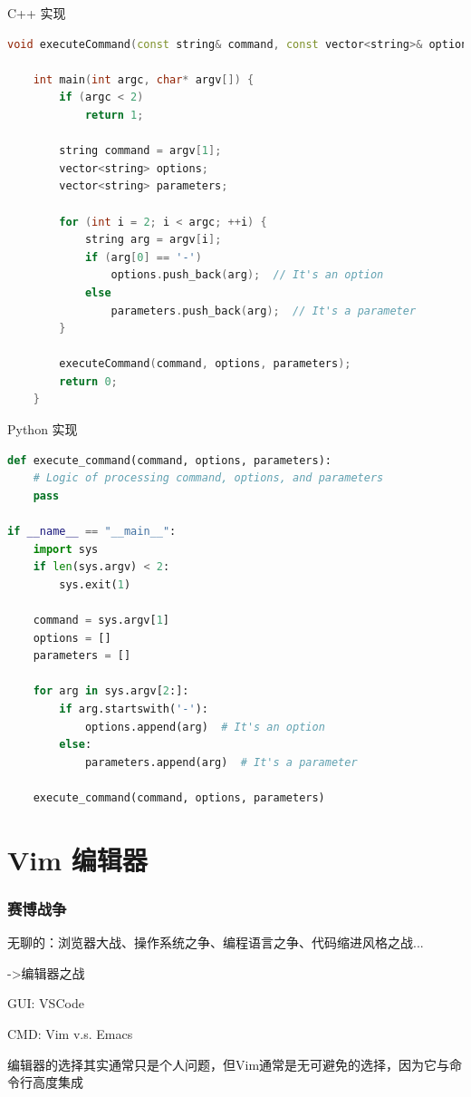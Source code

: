 \documentclass[UTF8, 16pt]{beamer}
\begin{document}
\begin{frame}[fragile]
    \textcolor{sufered}{C++ 实现}
    \begin{lstlisting}[language=c++,basicstyle=\ttfamily\scriptsize]
    void executeCommand(const string& command, const vector<string>& options, const vector<string>& parameters);
    
    int main(int argc, char* argv[]) {
        if (argc < 2)
            return 1;
        
        string command = argv[1];
        vector<string> options;
        vector<string> parameters;
        
        for (int i = 2; i < argc; ++i) {
            string arg = argv[i];
            if (arg[0] == '-')
                options.push_back(arg);  // It's an option
            else
                parameters.push_back(arg);  // It's a parameter
        }
        
        executeCommand(command, options, parameters); 
        return 0;
    }\end{lstlisting}
\end{frame}

\begin{frame}[fragile]
    \textcolor{sufered}{Python 实现}
    \begin{lstlisting}[language=python,basicstyle=\ttfamily\scriptsize]
def execute_command(command, options, parameters):
    # Logic of processing command, options, and parameters
    pass

if __name__ == "__main__":
    import sys
    if len(sys.argv) < 2:
        sys.exit(1)
    
    command = sys.argv[1]
    options = []
    parameters = []
    
    for arg in sys.argv[2:]:
        if arg.startswith('-'):
            options.append(arg)  # It's an option
        else:
            parameters.append(arg)  # It's a parameter
    
    execute_command(command, options, parameters)
\end{lstlisting}
\end{frame}

\section{Vim 编辑器}

\begin{frame}
    \frametitle{赛博战争}
    \textcolor{sufered}{无聊的：浏览器大战、操作系统之争、编程语言之争、代码缩进风格之战...}

    \textcolor{sufered}{->编辑器之战}

    GUI: VSCode

    CMD: Vim v.s. Emacs

    编辑器的选择其实通常只是个人问题，但Vim通常是无可避免的选择，因为它与命令行高度集成
\end{frame}
\end{document}
